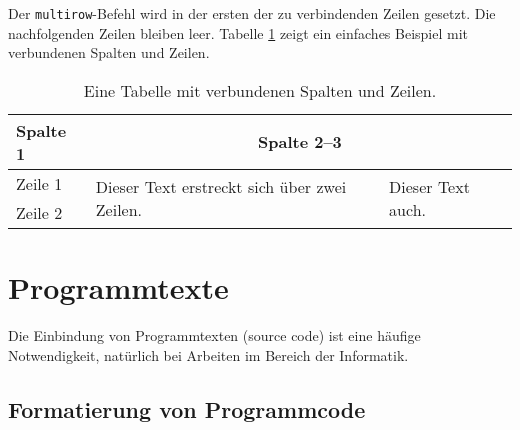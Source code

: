 Der \verb|multirow|-Befehl wird in der ersten der zu verbindenden Zeilen
gesetzt. Die nachfolgenden Zeilen bleiben leer. Tabelle
\ref{tab:multi-column-row-tabelle} zeigt ein einfaches Beispiel mit
verbundenen Spalten und Zeilen.

\begin{table}
	\caption{Eine Tabelle mit verbundenen Spalten und Zeilen.}
	\label{tab:multi-column-row-tabelle}
	\centering
	\setlength{\tabcolsep}{10pt} %
	\renewcommand{\arraystretch}{1.25}  %
	\begin{tabular}{@{}lll@{}}
		\toprule
		Spalte 1 & \multicolumn{2}{c}{Spalte 2--3} \\
		\midrule
		Zeile 1  & 
		\multirow{2}{4cm}{Dieser Text erstreckt sich über zwei Zeilen.} &
		\multirow{2}{*}{Dieser Text auch.} \\
	    Zeile 2  & & \\
		\bottomrule
	\end{tabular}
\end{table}


\section{Programmtexte}
\label{sec:programmtexte}

Die Einbindung von Programmtexten (source code) ist eine häufige Notwendigkeit,
\va natürlich bei Arbeiten im Bereich der Informatik.


\subsection{Formatierung von Programmcode}
\label{sec:FormatierungVonProgrammcode}

